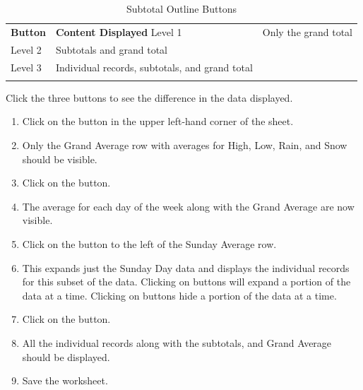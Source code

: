 \begin{table}[H]
	{\small
		\begin{longtable}{L{0.50in}L{3.00in}} %
			\textbf{Button} & \textbf{Content Displayed} \endhead
			\hline
			Level 1 & Only the grand total\\
			Level 2 & Subtotals and grand total\\
			Level 3 & Individual records, subtotals, and grand total\\
			\caption{Subtotal Outline Buttons}
			\label{05:tab06}
		\end{longtable}
	} %
\end{table}

Click the three  buttons to see the difference in the data displayed.

\begin{enumerate}
	\item Click on the  button in the upper left-hand corner of the sheet.
	\item Only the Grand Average row with averages for High, Low, Rain, and Snow should be visible.
	\item Click on the  button.
	\item The average for each day of the week along with the Grand Average are now visible.
	\item Click on the  button to the left of the Sunday Average row.
	\item This expands just the Sunday Day data and displays the individual records for this subset of the data. Clicking on  buttons will expand a portion of the data at a time. Clicking on  buttons hide a portion of the data at a time.
	\item Click on the  button.
	\item All the individual records along with the subtotals, and Grand Average should be displayed. 
	\item Save the worksheet.
\end{enumerate}

